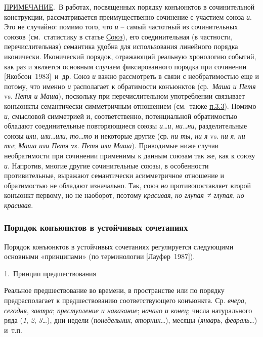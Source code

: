 \underline{ПРИМЕЧАНИЕ}.~В работах, посвященных порядку конъюнктов в
сочинительной конструкции, рассматривается преимущественно сочинение с
участием союза \textit{и}. Это не случайно: помимо того, что \textit{и} --
самый частотный из сочинительных союзов (см.~статистику в статье
\underline{Союз}), его соединительная (в частности, перечислительная)
семантика удобна для использования линейного порядка иконически.
Иконический порядок, отражающий реальную хронологию событий, как раз и
является основным случаем фиксированного порядка при сочинении
{[}Якобсон~1983{]}~и~др. Союз \textit{и} важно рассмотреть в связи с
необратимостью еще и потому, что именно \textit{и} располагает к
обратимости конъюнктов (ср.~\textit{Маша и Петя} vs. \textit{Петя и Маша}),
поскольку при перечислительном употреблении связывает конъюнкты
семантически симметричным отношением (см.~также \underline{п.3.3}).
Помимо \textit{и}, смысловой симметрией и, соответственно, потенциальной
обратимостью обладают соединительные повторяющиеся союзы
\textit{и\ldots и}, \textit{ни\ldots ни}, разделительные союзы \textit{или},
\textit{или\ldots или}, \textit{то\ldots то} и некоторые другие (ср.
\textit{ни ты}, \textit{ни я} vs. \textit{ни я}, \textit{ни ты}; \textit{Маша или
Петя} vs. \textit{Петя или Маша}). Приводимые ниже случаи необратимости
при сочинении применимы к данным союзам так же, как к союзу \textit{и}.
Напротив, многие другие сочинительные союзы, в особенности
противительные, выражают семантически асимметричное отношение и
обратимостью не обладают изначально. Так, союз \textit{но}
противопоставляет второй конъюнкт первому, но не наоборот, поэтому
\textit{красивая}, \textit{но глупая}~≠ \textit{глупая}, \textit{но красивая}.

\subsubsection{Порядок конъюнктов в устойчивых
сочетаниях}\label{ux43fux43eux440ux44fux434ux43eux43a-ux43aux43eux43dux44aux44eux43dux43aux442ux43eux432-ux432-ux443ux441ux442ux43eux439ux447ux438ux432ux44bux445-ux441ux43eux447ux435ux442ux430ux43dux438ux44fux445}

Порядок конъюнктов в устойчивых сочетаниях регулируется следующими
основными «принципами» (по терминологии {[}Лауфер~1987{]}).

1.~Принцип предшествования

Реальное предшествование во времени, в пространстве или по порядку
предрасполагает к предшествованию соответствующего конъюнкта. Ср.
\textit{вчера}, \textit{сегодня}, \textit{завтра}; \textit{преступление и
наказание}; \textit{начало и конец}; числа натурального ряда (\textit{1},
\textit{2}, \textit{3\ldots{}}), дни недели (\textit{понедельник},
\textit{вторник\ldots{}}), месяцы (\textit{январь}, \textit{февраль\ldots{}})
и~т.п.

